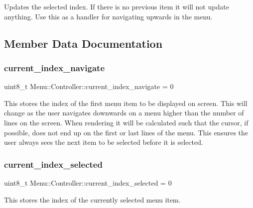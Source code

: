 Updates the selected index. If there is no previous item it will not update anything. Use this as a handler for navigating upwards in the menu. 

\subsection{Member Data Documentation}
\hypertarget{class_menu_1_1_controller_a86055b66afbad89c5a0b8a0a1713f9d3}{}\label{class_menu_1_1_controller_a86055b66afbad89c5a0b8a0a1713f9d3} 
\subsubsection{\texorpdfstring{current\+\_\+index\+\_\+navigate}{current\_index\_navigate}}
{\footnotesize\ttfamily uint8\+\_\+t Menu\+::\+Controller\+::current\+\_\+index\+\_\+navigate = 0\hspace{0.3cm}{\ttfamily [private]}}

This stores the index of the first menu item to be displayed on screen. This will change as the user navigates downwards on a menu higher than the number of lines on the screen. When rendering it will be calculated such that the cursor, if possible, does not end up on the first or last lines of the menu. This ensures the user always sees the next item to be selected before it is selected. \hypertarget{class_menu_1_1_controller_ab3bdee08f22d55f8fa0cb9e29bb27d66}{}\label{class_menu_1_1_controller_ab3bdee08f22d55f8fa0cb9e29bb27d66} 
\subsubsection{\texorpdfstring{current\+\_\+index\+\_\+selected}{current\_index\_selected}}
{\footnotesize\ttfamily uint8\+\_\+t Menu\+::\+Controller\+::current\+\_\+index\+\_\+selected = 0\hspace{0.3cm}{\ttfamily [private]}}

This stores the index of the currently selected menu item. \hypertarget{class_menu_1_1_controller_a288e26b1efe4fd953b5514de72a1c508}{}\label{class_menu_1_1_controller_a288e26b1efe4fd953b5514de72a1c508} 
